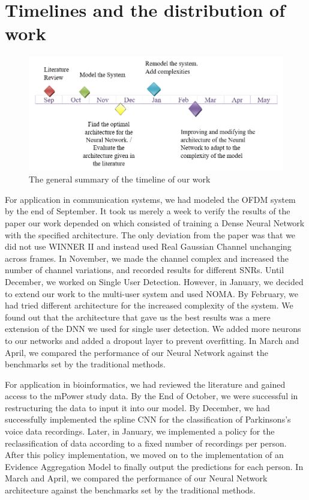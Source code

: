 \section{Timelines and the distribution of work}
\begin{figure}[htbp]
  \centering
  \includegraphics[width=\textwidth]{./Figures/timeline.png}
  \caption{The general summary of the timeline of our work}
  \label{fig:timeline}
\end{figure}
For application in communication systems, we had modeled the OFDM system by the end of September. It took us merely a week to verify the results of the paper our work depended on which consisted of training a Dense Neural Network with the specified architecture. The only deviation from the paper was that we did not use WINNER II and instead used Real Gaussian Channel unchanging across frames. In November, we made the channel complex and increased the number of channel variations, and recorded results for different SNRs. Until December, we worked on Single User Detection. However, in January, we decided to extend our work to the multi-user system and used NOMA. By February, we had tried different architecture for the increased complexity of the system. We found out that the architecture that gave us the best results was a mere extension of the DNN we used for single user detection. We added more neurons to our networks and added a dropout layer to prevent overfitting. In March and April, we compared the performance of our Neural Network against the benchmarks set by the traditional methods. 

For application in bioinformatics, we had reviewed the literature and gained access to the mPower study data. By the End of October, we were successful in restructuring the data to input it into our model. By December, we had successfully implemented the spline CNN \cite{balestriero2018spline} for the classification of Parkinsons's voice data recordings. Later, in January, we implemented a policy for the reclassification of data according to a fixed number of recordings per person. After this policy implementation, we moved on to the implementation of an Evidence Aggregation Model to finally output the predictions for each person. In March and April, we compared the performance of our Neural Network architecture against the benchmarks set by the traditional methods.
